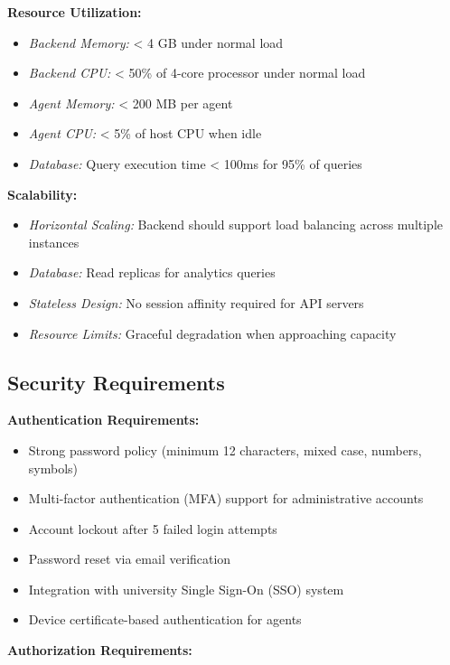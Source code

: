\documentclass[12pt,a4paper]{article}
\begin{document}
\textbf{Resource Utilization:}

\begin{itemize}
    \item \textit{Backend Memory:} < 4 GB under normal load
    \item \textit{Backend CPU:} < 50\% of 4-core processor under normal load
    \item \textit{Agent Memory:} < 200 MB per agent
    \item \textit{Agent CPU:} < 5\% of host CPU when idle
    \item \textit{Database:} Query execution time < 100ms for 95\% of queries
\end{itemize}
\textbf{Scalability:}

\begin{itemize}
    \item \textit{Horizontal Scaling:} Backend should support load balancing across multiple instances
    \item \textit{Database:} Read replicas for analytics queries
    \item \textit{Stateless Design:} No session affinity required for API servers
    \item \textit{Resource Limits:} Graceful degradation when approaching capacity
\end{itemize}

\subsection{Security Requirements}
\label{sec:security}

\textbf{Authentication Requirements:}

\begin{itemize}
    \item Strong password policy (minimum 12 characters, mixed case, numbers, symbols)
    \item Multi-factor authentication (MFA) support for administrative accounts
    \item Account lockout after 5 failed login attempts
    \item Password reset via email verification
    \item Integration with university Single Sign-On (SSO) system
    \item Device certificate-based authentication for agents
\end{itemize}

\textbf{Authorization Requirements:}
\end{document}

